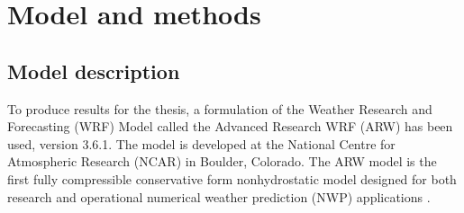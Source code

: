 \chapter{Model and methods}
\label{chap:modmet}
\section{Model description}
\label{sec:modeldes}
To produce results for the thesis, a formulation of the Weather Research and Forecasting (WRF) Model called the Advanced Research WRF (ARW) has been used, version 3.6.1. The model is developed at the National Centre for Atmospheric Research (NCAR) in Boulder, Colorado. The ARW model is the first fully compressible conservative form nonhydrostatic model designed for both research and operational numerical weather prediction (NWP) applications \citep{Skamarock2008}.

